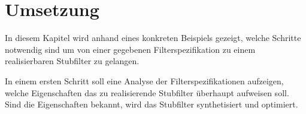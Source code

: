 \section{Umsetzung}

In  diesem  Kapitel  wird  anhand  eines  konkreten  Beispiels gezeigt, welche
Schritte notwendig sind um von  einer  gegebenen  Filterspezifikation zu einem
realisierbaren Stubfilter zu gelangen.

In einem ersten Schritt soll eine Analyse der Filterspezifikationen aufzeigen,
welche Eigenschaften das zu realisierende Stubfilter überhaupt aufweisen soll.
Sind  die  Eigenschaften  bekannt,  wird  das  Stubfilter   synthetisiert  und
optimiert.




\clearpage

